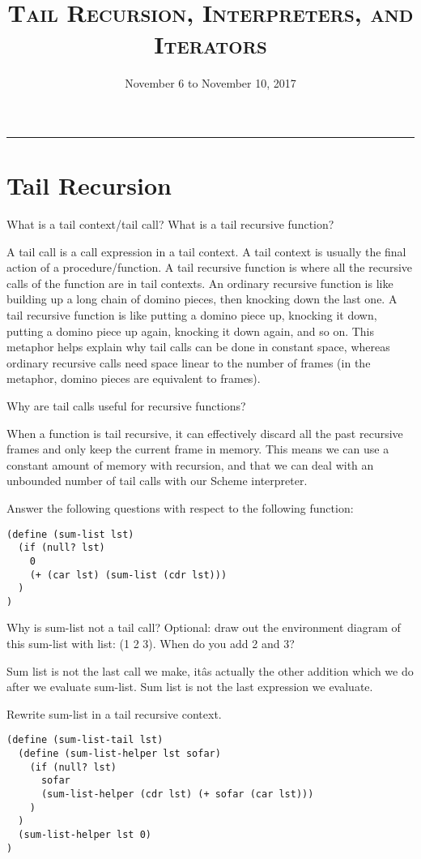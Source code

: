 \documentclass{exam}
\title{\textsc{Tail Recursion, Interpreters, and Iterators}}
\date{November 6 to November 10, 2017}
\begin{document}
\maketitle
\rule{\textwidth}{0.15em}
\fontsize{12}{15}\selectfont



\section{Tail Recursion}
\begin{questions}
\question What is a tail context/tail call? What is a tail recursive function?
\begin{solution}[0.5in]
A tail call is a call expression in a tail context. A tail context is usually the final action of a procedure/function.\newline
\newline
A tail recursive function is where all the recursive calls of the function are in tail contexts. \newline
\newline
An ordinary recursive function is like building up a long chain of domino pieces, then knocking down the last one. A tail recursive function is like putting a domino piece up, knocking it down, putting a domino piece up again, knocking it down again, and so on. This metaphor helps explain why tail calls can be done in constant space, whereas ordinary recursive calls need space linear to the number of frames (in the metaphor, domino pieces are equivalent to frames).
\end{solution}
\question Why are tail calls useful for recursive functions?
\begin{solution}[0.5in]
When a function is tail recursive, it can effectively discard all the past recursive frames and only keep the current frame in memory. This means we can use a constant amount of memory with recursion, and that we can deal with an unbounded number of tail calls with our Scheme interpreter.
\end{solution}

Answer the following questions with respect to the following function:
\begin{lstlisting}
(define (sum-list lst)
  (if (null? lst)
    0
    (+ (car lst) (sum-list (cdr lst)))
  )
)
\end{lstlisting}
\question Why is sum-list not a tail call? Optional: draw out the environment diagram of this sum-list with list: (1 2 3). When do you add 2 and 3?
\begin{solution}[0.5in]
Sum list is not the last call we make, itâs actually the other addition which we do after we evaluate sum-list. Sum list is not the last expression we evaluate.
\end{solution}
\question Rewrite sum-list in a tail recursive context.
\begin{solution}[0.5in]
\begin{lstlisting}
(define (sum-list-tail lst)
  (define (sum-list-helper lst sofar)
    (if (null? lst)
      sofar
      (sum-list-helper (cdr lst) (+ sofar (car lst)))
    )
  )
  (sum-list-helper lst 0)
)
\end{lstlisting}
\end{solution}



\end{questions}
\end{document}
